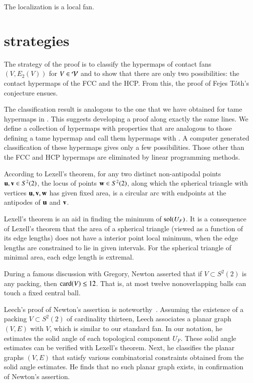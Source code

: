 \documentclass{llncs}
\begin{document}
The localization is a local fan.

\section{strategies}

The strategy of the proof is to classify the hypermaps of contact
fans $(V,E_2(V))$ for $V\in {\mathcal V}$ and to show that there are only two
possibilities: the contact hypermaps of the FCC and the HCP.  From
this, the proof of Fejes T\'oth's conjecture ensues.

The classification result is analogous to the one that we have 
obtained for tame hypermaps in \cite{DSP}.  
This suggests developing a proof along
exactly the same lines.  We define a 
collection of hypermaps with properties that are analogous to those
defining a tame hypermap and call them hypermaps with 
.  A computer generated classification of these hypermaps
gives only a few possibilities.  Those other than the FCC and
HCP hypermaps are eliminated by linear programming methods.


\begin{remark}
According to Lexell's theorem, for any two distinct non-antipodal points ${\mathbf u},{\mathbf v}\in S^2(2)$,
the locus of points ${\mathbf w}\in S^2(2)$, along which
the spherical triangle with vertices ${\mathbf u},{\mathbf v},{\mathbf w}$ has given fixed area, is a circular arc
with endpoints at the antipodes of ${\mathbf u}$ and ${\mathbf v}$.

Lexell's theorem is an aid in finding the minimum of
  $\operatorname{sol}(U_F)$.
  It is a consequence of Lexell's theorem that the area of a spherical
  triangle (viewed as a function of its edge lengths) does not have a
  interior point local minimum, when the edge lengths are
  constrained to lie in given intervals.  For the spherical triangle of minimal area,
each  edge length is extremal.
%
%
\end{remark}

\begin{remark}
During a famous discussion with Gregory, Newton asserted that 
if $V\subset S^2(2)$ is any packing, then ${\hbox{card}}(V)\le 12$. That is, at most
twelve nonoverlapping balls can touch a fixed central ball.  
%
%
%
%
  
 Leech's proof of Newton's assertion is
noteworthy~\cite{Leech:1956:MG}.  Assuming the existence of a packing
$V\subset S^2(2)$ of cardinality thirteen, Leech associates a planar graph
$(V,E)$ with $V$, which is similar to our standard fan.  In
our notation, he estimates the solid angle of each topological
component $U_F$.  These solid angle estimates can be verified with Lexell's theorem.
Next, he classifies the planar graphs $(V,E)$ that satisfy various
combinatorial constraints obtained from the solid angle estimates. He
finds that no such planar graph exists, in confirmation of Newton's
assertion.
\end{remark}
\end{document}
